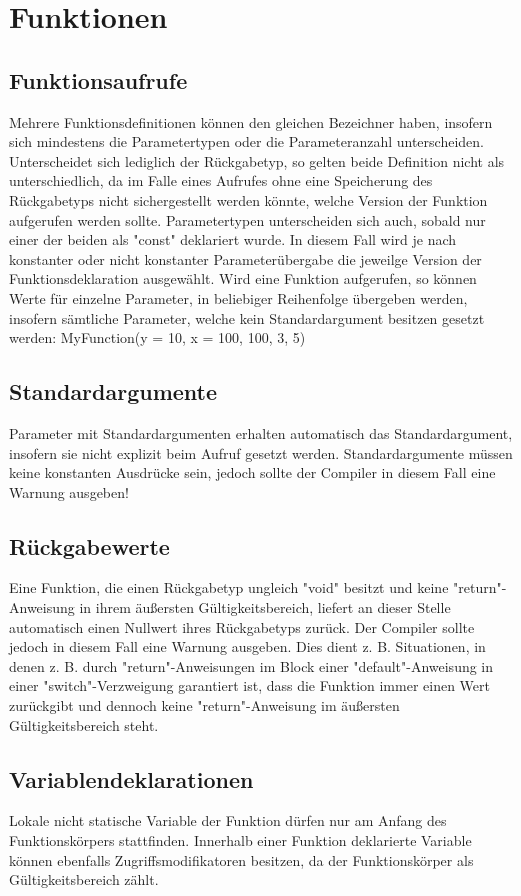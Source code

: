 \chapter{Funktionen}

\section{Funktionsaufrufe}
Mehrere Funktionsdefinitionen können den gleichen Bezeichner haben, insofern sich mindestens die Parametertypen oder die Parameteranzahl unterscheiden.
Unterscheidet sich lediglich der Rückgabetyp, so gelten beide Definition nicht als unterschiedlich, da im Falle eines Aufrufes ohne eine Speicherung
des Rückgabetyps nicht sichergestellt werden könnte, welche Version der Funktion aufgerufen werden sollte.
Parametertypen unterscheiden sich auch, sobald nur einer der beiden als "const" deklariert wurde. In diesem Fall wird je nach konstanter oder nicht
konstanter Parameterübergabe die jeweilge Version der Funktionsdeklaration ausgewählt.
Wird eine Funktion aufgerufen, so können Werte für einzelne Parameter, in beliebiger Reihenfolge übergeben werden, insofern sämtliche
Parameter, welche kein Standardargument besitzen gesetzt werden:
MyFunction(y = 10, x = 100, 100, 3, 5)

\section{Standardargumente}
Parameter mit Standardargumenten erhalten automatisch das Standardargument, insofern sie nicht explizit beim Aufruf gesetzt werden.
Standardargumente müssen keine konstanten Ausdrücke sein, jedoch sollte der Compiler in diesem Fall eine Warnung ausgeben!

\section{Rückgabewerte}
Eine Funktion, die einen Rückgabetyp ungleich "void" besitzt und keine "return"-Anweisung in ihrem äußersten Gültigkeitsbereich, liefert an dieser Stelle
automatisch einen Nullwert ihres Rückgabetyps zurück. Der Compiler sollte jedoch in diesem Fall eine Warnung ausgeben.
Dies dient z. B. Situationen, in denen z. B. durch "return"-Anweisungen im Block einer "default"-Anweisung in einer "switch"-Verzweigung
garantiert ist, dass die Funktion immer einen Wert zurückgibt und dennoch keine "return"-Anweisung im äußersten Gültigkeitsbereich steht.

\section{Variablendeklarationen}
Lokale nicht statische Variable der Funktion dürfen nur am Anfang des Funktionskörpers stattfinden. Innerhalb einer Funktion deklarierte
Variable können ebenfalls Zugriffsmodifikatoren besitzen, da der Funktionskörper als Gültigkeitsbereich zählt.

